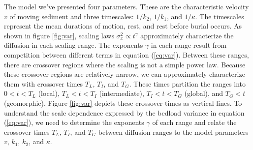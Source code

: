 \documentclass[draft,grl]{agujournal2018}
\begin{document}
The model we've presented   four parameters. These are the characteristic velocity $v$ of moving sediment and three timescales: $1/k_2$, $1/k_1$, and $1/\kappa$.
The timescales represent the mean durations of motion, rest, and rest before burial occurs.
As shown in figure \ref{fig:var}, scaling laws $\sigma_x^2 \propto t^\gamma$ approximately characterize the diffusion in each scaling range.
The exponents $\gamma$ in each range result from competition between different terms in equation (\ref{eq:var}).
Between these ranges, there are crossover regions where the scaling is not a simple power law.
Because these crossover regions are relatively narrow, we can approximately characterize them with crossover times $T_L$, $T_I$, and $T_G$.
These times partition the ranges into $0< t < T_L$ (local), $T_L < t < T_I$ (intermediate), $T_I < t < T_G$ (global), and $T_G < t$ (geomorphic). 
Figure \ref{fig:var} depicts these crossover times as vertical lines.
To understand the scale dependence expressed by the bedload variance in equation (\ref{eq:var}), we need to determine the exponents $\gamma$ of each range and relate the crossover times $T_L$, $T_I$, and $T_G$ between diffusion ranges to the model parameters $v$, $k_1$, $k_2$, and $\kappa$.
\end{document}
